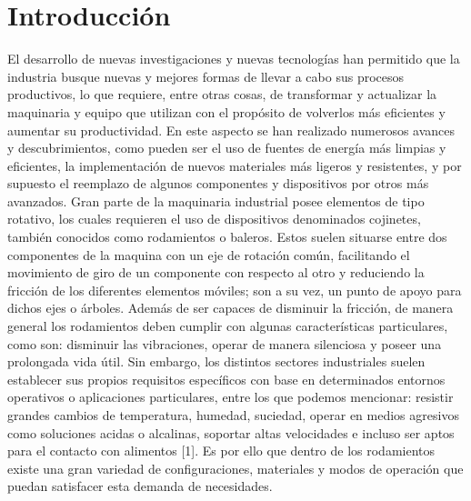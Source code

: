 %
\chapter{Introducción}			%
\label{sec:intro}


El desarrollo de nuevas investigaciones y nuevas tecnologías han permitido que la industria busque nuevas y mejores formas de llevar a cabo sus procesos productivos, lo que requiere, entre otras cosas, de transformar y actualizar la maquinaria y equipo que utilizan con el propósito de volverlos más eficientes y aumentar su productividad.
En este aspecto se han realizado numerosos avances y descubrimientos, como pueden ser el uso de fuentes de energía más limpias y eficientes, la implementación de nuevos materiales más ligeros y resistentes, y por supuesto el reemplazo de algunos componentes y dispositivos por otros más avanzados.
Gran parte de la maquinaria industrial posee elementos de tipo rotativo, los cuales requieren el uso de dispositivos denominados cojinetes, también conocidos como rodamientos o baleros. Estos suelen situarse entre dos componentes de la maquina con un eje de rotación común, facilitando el movimiento de giro de un componente con respecto al otro y reduciendo la fricción de los diferentes elementos móviles; son a su vez, un punto de apoyo para dichos ejes o árboles. 
Además de ser capaces de disminuir la fricción, de manera general los rodamientos deben cumplir con algunas características particulares, como son: disminuir las vibraciones, operar de manera silenciosa y poseer una prolongada vida útil. Sin embargo, los distintos sectores industriales suelen establecer sus propios requisitos específicos con base en determinados entornos operativos o aplicaciones particulares, entre los que podemos mencionar: resistir grandes cambios de temperatura, humedad, suciedad, operar en medios agresivos como soluciones acidas o alcalinas, soportar altas velocidades e incluso ser aptos para el contacto con alimentos [1]. 
Es por ello que dentro de los rodamientos existe una gran variedad de configuraciones, materiales y modos de operación que puedan satisfacer esta demanda de necesidades.


